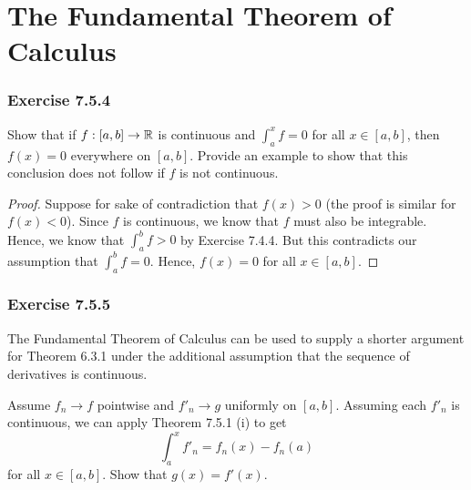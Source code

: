 \section{The Fundamental Theorem of Calculus}


\subsubsection{Exercise 7.5.4} Show that if \( f: [a,b] \to \mathbb{R}  \) is continuous and \( \int_{ a }^{ x } f = 0   \) for all \( x \in [a,b]  \), then \( f(x) = 0  \) everywhere on \( [a,b]  \). Provide an example to show that this conclusion does not follow if \( f  \) is not continuous.
\begin{proof}
	Suppose for sake of contradiction that \( f(x) > 0  \) (the proof is similar for \( f(x) < 0  \)). Since \( f \) is continuous, we know that \( f  \) must also be integrable. Hence, we know that \( \int_{ a }^{ b } f   > 0  \) by Exercise 7.4.4. But this contradicts our assumption that \( \int_{ a }^{ b } f   = 0  \). Hence, \( f(x) = 0  \) for all \( x \in [a,b] \).
\end{proof}




\subsubsection{Exercise 7.5.5} The Fundamental Theorem of Calculus can be used to supply a shorter argument for Theorem 6.3.1 under the additional assumption that the sequence of derivatives is continuous.

Assume \( f_{n} \to f  \) pointwise and \( f'_{n} \to g  \) uniformly on \( [a,b]  \). Assuming each \( f'_{n}  \) is continuous, we can apply Theorem 7.5.1 (i) to get 
\[  \int_{ a }^{ x } f'_{n}   = f_{n}(x) - f_{n}(a)  \]
for all \( x \in [a,b]  \). Show that \( g(x) = f'(x) \).


